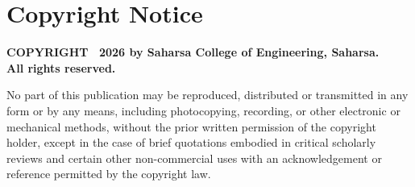 \documentclass[12pt, a4paper, oneside]{report}
\begin{document}
\clearpage

\chapter*{Copyright Notice}
\thispagestyle{plain}

\vspace{1.0cm}

\begin{center}
\textbf{COPYRIGHT \textcopyright\ 2026 by Saharsa College of Engineering, Saharsa.}\\
\textbf{All rights reserved.}
\end{center}

\vspace{0.8cm}

No part of this publication may be reproduced, distributed or transmitted in any form or by any means, including photocopying, recording, or other electronic or mechanical methods, without the prior written permission of the copyright holder, except in the case of brief quotations embodied in critical scholarly reviews and certain other non-commercial uses with an acknowledgement or reference permitted by the copyright law.

\clearpage

\end{document}
